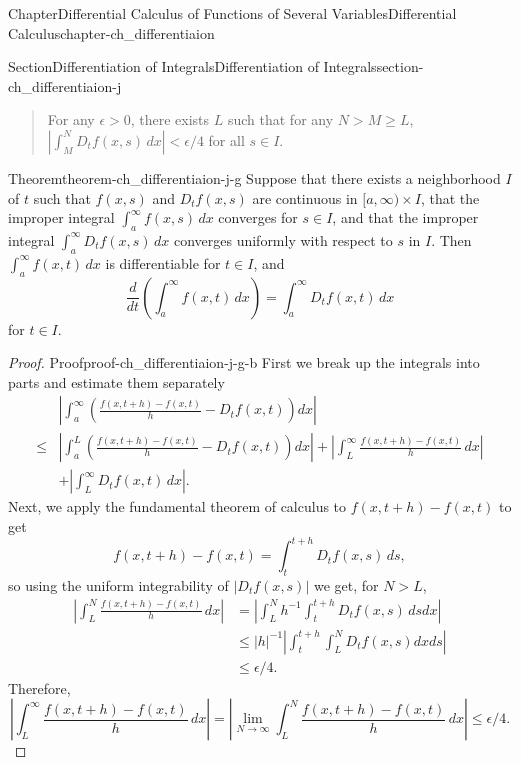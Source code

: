 \documentclass[oneside,10pt,]{book}
\numberwithin{equation}{section}
\newcommand{\gt}{>}
\newcommand{\amp}{&}
\begin{document}
\begin{chapterptx}{Chapter}{Differential Calculus of Functions of Several Variables}{}{Differential Calculus}{}{}{chapter-ch_differentiaion}
\begin{sectionptx}{Section}{Differentiation of Integrals}{}{Differentiation of Integrals}{}{}{section-ch_differentiaion-j}
\begin{quote}
For any \(\epsilon \gt 0\), there exists \(L\) such that  for any \(N>M\ge L\), \(| \int_M^{N} D_t f(x,s)\,dx | < \epsilon/4\) for all \(s\in I\).\end{quote}
%
\begin{theorem}{Theorem}{}{}{theorem-ch_differentiaion-j-g}%
Suppose that there exists a neighborhood \(I\) of \(t\) such that  \(f(x,s)\) and \(D_t f(x,s)\) are continuous in \([a,\infty) \times I\), that the improper integral \(\int_a^{\infty} f(x,s)\,dx\) converges for \(s \in I\), and that the improper integral \(\int_a^{\infty} D_t f(x,s)\,dx\) converges uniformly with respect to \(s\) in  \(I\). Then \(\int_a^{\infty}  f(x,t)\, dx\) is differentiable for \(t\in I\), and%
\begin{equation*}
\frac{d}{dt} \left( \int_a^{\infty} f(x,t)\, dx \right)=\int_a^{\infty} D_t f(x,t)\, dx
\end{equation*}
for \(t\in I\).\end{theorem}
\begin{proof}{Proof}{}{proof-ch_differentiaion-j-g-b}
First we break up the integrals into parts and estimate them separately%
\begin{align*}
\amp \left| \int_a^{\infty}  \left(  \frac{f(x,t+h)-f(x,t)}{h} - D_t f(x,t) \right) dx \right|\\
\le \amp 
\left| \int_a^{L}  \left(  \frac{f(x,t+h)-f(x,t)}{h} - D_t f(x,t) \right) dx \right| 
+ \left| \int_L^{\infty}   \frac{f(x,t+h)-f(x,t)}{h} \,dx \right| \\
\amp + \left| \int_L^{\infty}   D_t f(x,t) \, dx \right|.
\end{align*}
%
 Next, we apply the fundamental  theorem of calculus to \(f(x,t+h)-f(x,t)\) to get%
\begin{equation*}
f(x,t+h)-f(x,t)=\int_t^{t+h} D_t f(x,s)\,ds,
\end{equation*}
so using the uniform integrability of \(|D_t f(x,s)|\) we get, for \(N>L\),%
\begin{align*}
\left| \int_L^{N}   \frac{f(x,t+h)-f(x,t)}{h} \,dx \right| \amp= 
\left| \int_L^{N} h^{-1} \int_t^{t+h} D_t f(x,s)\,ds dx \right| \\
\amp \le  |h|^{-1} | \int_t^{t+h} \int_L^{N} D_t f(x,s) dx ds |\\
\amp \le \epsilon/4.
\end{align*}
Therefore,%
\begin{equation*}
\left| \int_L^{\infty}   \frac{f(x,t+h)-f(x,t)}{h} \,dx  \right| = \left| \lim_{N\to \infty}  \int_L^{N}   \frac{f(x,t+h)-f(x,t)}{h} \,dx \right| \le \epsilon/4.

\end{equation*}
\end{proof}
\end{sectionptx}
\end{chapterptx}
\end{document}
